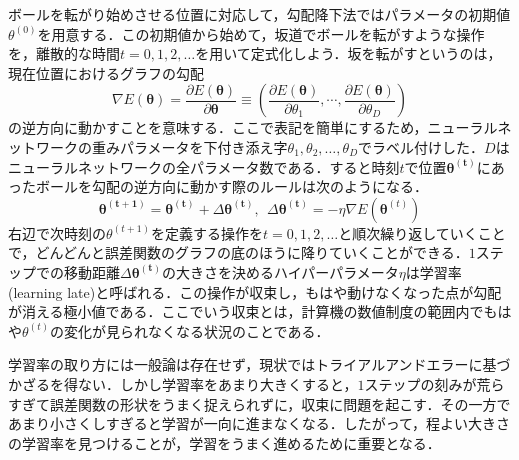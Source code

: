 \documentclass[a4paper,11pt]{jsreport}
\begin{document}
ボールを転がり始めさせる位置に対応して，勾配降下法ではパラメータの初期値$\theta^{(0)}$を用意する．この初期値から始めて，坂道でボールを転がすような操作を，離散的な時間$t=0,1,2,\dots$を用いて定式化しよう．坂を転がすというのは，現在位置におけるグラフの勾配
\begin{equation}
  \nabla E(\bm{\theta})
  = \frac{\partial E(\bm{\theta})}{\partial \bm{\theta}}
  \equiv \left(  \frac{\partial E(\bm{\theta})}{\partial \theta_1}, \cdots,  \frac{\partial E(\bm{\theta})}{\partial \theta_D} \right)
\end{equation}
の逆方向に動かすことを意味する．ここで表記を簡単にするため，ニューラルネットワークの重みパラメータを下付き添え字$\theta_1,\theta_2,\dots,\theta_D$でラベル付けした．$D$はニューラルネットワークの全パラメータ数である．すると時刻$t$で位置$\bm{\theta^{(t)}}$にあったボールを勾配の逆方向に動かす際のルールは次のようになる．
\begin{equation}
  \bm{\theta^{(t+1)}} = \bm{\theta^{(t)}} + \Delta \bm{\theta^{(t)}} , \ \  \Delta \bm{\theta^{(t)}} = - \eta \nabla E\left( \bm{\theta}^{(t)} \right)
\end{equation}
右辺で次時刻の$\theta^{(t+1)}$を定義する操作を$t=0,1,2,\dots$と順次繰り返していくことで，どんどんと誤差関数のグラフの底のほうに降りていくことができる．$1$ステップでの移動距離$\Delta \bm{\theta^{(t)}}$の大きさを決めるハイパーパラメータ$\eta$は学習率(learning late)と呼ばれる．この操作が収束し，もはや動けなくなった点が勾配が消える極小値である．ここでいう収束とは，計算機の数値制度の範囲内でもはや$\theta^{(t)}$の変化が見られなくなる状況のことである．\par
学習率の取り方には一般論は存在せず，現状ではトライアルアンドエラーに基づかざるを得ない．しかし学習率をあまり大きくすると，$1$ステップの刻みが荒らすぎて誤差関数の形状をうまく捉えられずに，収束に問題を起こす．その一方であまり小さくしすぎると学習が一向に進まなくなる．したがって，程よい大きさの学習率を見つけることが，学習をうまく進めるために重要となる．\par
\end{document}
